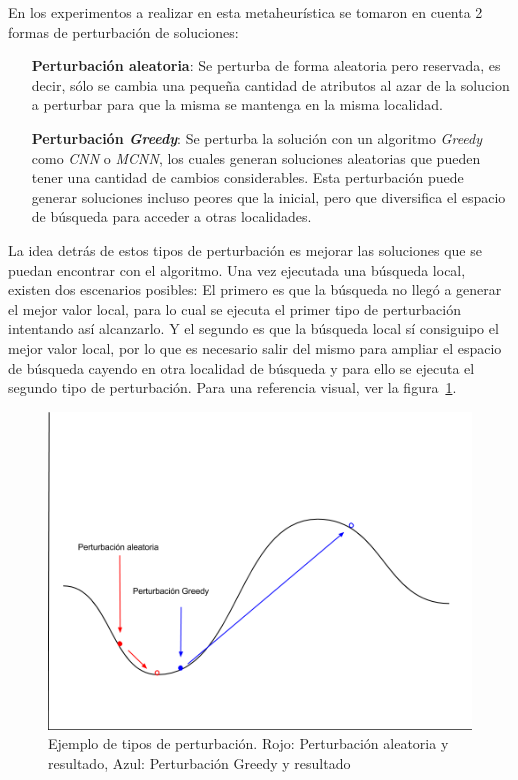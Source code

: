 \documentclass{ci5652}
\begin{document}
En los experimentos a realizar en esta metaheurística se tomaron en cuenta 2 formas de perturbación de soluciones:

\begin{itemize}
    \item [\textbf{Perturbación aleatoria}:] Se perturba de forma aleatoria pero reservada, es decir, sólo se cambia una pequeña cantidad de atributos al azar de la solucion a perturbar para que la misma se mantenga en la misma localidad.
    \item [\textbf{Perturbación \textit{Greedy}}:] Se perturba la solución con un algoritmo \textit{Greedy} como \textit{CNN }o \textit{MCNN}, los cuales generan soluciones aleatorias que pueden tener una cantidad de cambios considerables. Esta perturbación puede generar soluciones incluso peores que la inicial, pero que diversifica el espacio de búsqueda para acceder a otras localidades.
\end{itemize}

La idea detrás de estos tipos de perturbación es mejorar las soluciones que se puedan encontrar con el algoritmo. Una vez ejecutada una búsqueda local, existen dos escenarios posibles: El primero es que la búsqueda no llegó a generar el mejor valor local, para lo cual se ejecuta el primer tipo de perturbación intentando así alcanzarlo. Y el segundo es que la búsqueda local sí consiguipo el mejor valor local, por lo que es necesario salir del mismo para ampliar el espacio de búsqueda cayendo en otra localidad de búsqueda y para ello se ejecuta el segundo tipo de perturbación. Para una referencia visual, ver la figura~\ref{fig:perturbaciones}.

\begin{figure}[h!]
    \centering
    \includegraphics[width=\linewidth]{perturbaciones}
    \caption{Ejemplo de tipos de perturbación. Rojo: Perturbación aleatoria y resultado, Azul: Perturbación Greedy y resultado}
    \label{fig:perturbaciones}
\end{figure}
\end{document}
